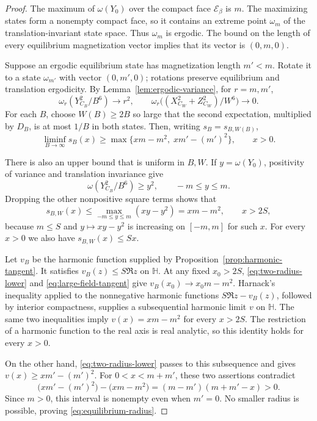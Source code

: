 \begin{proof}
The maximum of $\omega(Y_0)$ over the compact face
$\mathcal E_\beta$ is $m$.  The maximizing states form a nonempty
compact face, so it contains an extreme point $\omega_m$ of the
translation-invariant state space.  Thus $\omega_m$ is ergodic.  The
bound on the length of every equilibrium magnetization vector implies
that its vector is $(0,m,0)$.

Suppose an ergodic equilibrium state has magnetization length
$m'<m$.  Rotate it to a state $\omega_{m'}$ with vector $(0,m',0)$;
rotations preserve equilibrium and translation ergodicity.  By
Lemma~\ref{lem:ergodic-variance}, for $r=m,m'$,
\[
 \omega_r(Y_{C_B}^2/B^6)\longrightarrow r^2,
 \qquad
 \omega_r\bigl((X_{C_W}^2+Z_{C_W}^2)/W^6\bigr)
                                          \longrightarrow0.
\]
For each $B$, choose $W(B)\ge2B$ so large that the second expectation,
multiplied by $D_B$, is at most $1/B$ in both states.  Then, writing
$s_B=s_{B,W(B)}$,
\begin{equation}
 \liminf_{B\to\infty}s_B(x)
        \ge\max\{xm-m^2,\;xm'-(m')^2\},\qquad x>0.
 \label{eq:two-radius-lower}
\end{equation}

There is also an upper bound that is uniform in $B,W$.  If
$y=\omega(Y_0)$, positivity of variance and translation invariance
give
\[
 \omega(Y_{C_B}^2/B^6)\ge y^2,\qquad -m\le y\le m.
\]
Dropping the other nonpositive square terms shows that
\begin{equation}
 s_{B,W}(x)\le\max_{-m\le y\le m}(xy-y^2)
                 =xm-m^2,\qquad x>2S,
 \label{eq:large-field-tangent}
\end{equation}
because $m\le S$ and $y\mapsto xy-y^2$ is increasing on $[-m,m]$
for such $x$.  For every $x>0$ we also have $s_{B,W}(x)\le Sx$.

Let $v_B$ be the harmonic function supplied by
Proposition~\ref{prop:harmonic-tangent}.  It satisfies
$v_B(z)\le S\Re z$ on $\mathbb H$.  At any fixed $x_0>2S$,
\eqref{eq:two-radius-lower} and \eqref{eq:large-field-tangent} give
$v_B(x_0)\to x_0m-m^2$.  Harnack's inequality applied to the
nonnegative harmonic functions $S\Re z-v_B(z)$, followed by interior
compactness, supplies a subsequential harmonic limit $v$ on
$\mathbb H$.  The same two inequalities imply
$v(x)=xm-m^2$ for every $x>2S$.  The restriction of a harmonic
function to the real axis is real analytic, so this identity holds
for every $x>0$.

On the other hand, \eqref{eq:two-radius-lower} passes to this
subsequence and gives $v(x)\ge xm'-(m')^2$.  For
$0<x<m+m'$, these two assertions contradict
\[
 \bigl(xm'-(m')^2\bigr)-\bigl(xm-m^2\bigr)
           =(m-m')(m+m'-x)>0.
\]
Since $m>0$, this interval is nonempty even when $m'=0$.
No smaller radius is possible, proving \eqref{eq:equilibrium-radius}.
\end{proof}
